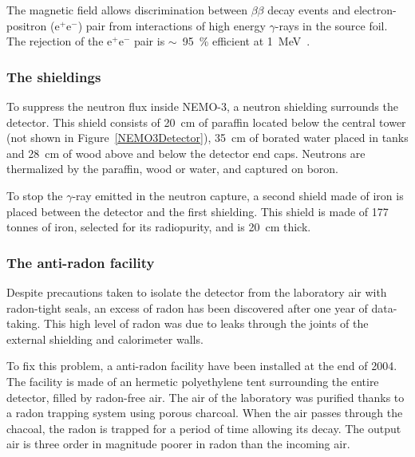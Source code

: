 \documentclass[main.tex]{subfiles}
\begin{document}
\bigskip


\NI The magnetic field allows discrimination between $\beta\beta$ decay events and electron-positron (e$^+$e$^-$) pair from interactions of high energy $\gamma$-rays in the source foil. The rejection of the e$^+$e$^-$ pair is $\sim$~95~\% efficient at 1~MeV~\cite{NEMO-3-detector}. 

\bigskip


\subsubsection{The shieldings}


\NI To suppress the neutron flux inside NEMO-3, a neutron shielding surrounds the detector. This shield consists of 20~cm of paraffin located below the central tower (not shown in Figure~\ref{NEMO3Detector}), 35~cm of borated water placed in tanks and 28~cm of wood above and below the detector end caps. Neutrons are thermalized by the paraffin, wood or water, and captured on boron. 


\bigskip

\NI To stop the $\gamma$-ray emitted in the neutron capture, a second shield made of iron is placed between the detector and the first shielding. This shield is made of 177 tonnes of iron, selected for its radiopurity, and is 20~cm thick.


\subsubsection{The anti-radon facility}


\NI Despite precautions taken to isolate the detector from the laboratory air with radon-tight seals, an excess of radon has been discovered after one year of data-taking. This high level of radon was due to leaks through the joints of the external shielding and calorimeter walls.


\bigskip


\NI To fix this problem, a anti-radon facility have been installed at the end of 2004. The facility is made of an hermetic polyethylene tent surrounding the entire detector, filled by radon-free air. The air of the laboratory was purified thanks to a radon trapping system using porous charcoal. When the air passes through the chacoal, the radon is trapped for a period of time allowing its decay. The output air is three order in magnitude poorer in radon than the incoming air.


\bigskip
\end{document}
